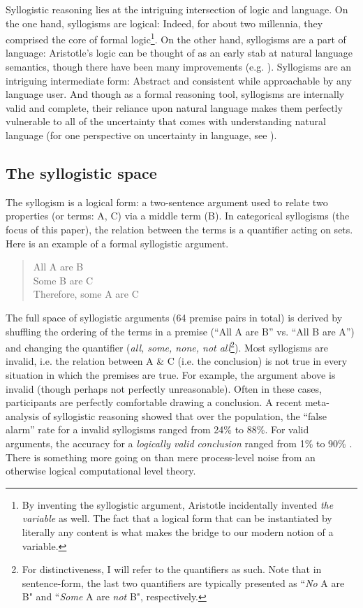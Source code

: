 \documentclass{llncs} %
\begin{document}
Syllogistic reasoning lies at the intriguing intersection of logic and language. On the one hand, syllogisms are logical: Indeed, for about two millennia, they comprised the core of formal logic\footnote{By inventing the syllogistic argument, Aristotle incidentally invented \emph{the variable} as well. The fact that a logical form that can be instantiated by literally any content is what makes the bridge to our modern notion of a variable.}. On the other hand, syllogisms are a part of language: Aristotle's logic can be thought of as an early stab at natural language semantics, though there have been many improvements (e.g. ). Syllogisms are an intriguing intermediate form: Abstract and consistent while approachable by any language user. And though as a formal reasoning tool, syllogisms are internally valid and complete, their reliance upon natural language makes them perfectly vulnerable to all of the uncertainty that comes with understanding natural language (for one perspective on uncertainty in language, see ).

\subsection{The syllogistic space}

The syllogism is a logical form: a two-sentence argument used to relate two properties (or terms: A, C) via a middle term (B). In categorical syllogisms (the focus of this paper), the relation between the terms is a quantifier acting on sets. Here is an example of a formal syllogistic argument.
\begin{quote}
All A are B\\
Some B are C\\
Therefore, some A are C
\end{quote}
The full space of syllogistic arguments (64 premise pairs in total) is derived by shuffling the ordering of the terms in a premise (``All A are B'' vs. ``All B are A'') and changing the quantifier (\emph{all, some, none, not all}\footnote{For distinctiveness, I will refer to the quantifiers as such. Note that in sentence-form, the last two quantifiers are typically presented as ``\emph{No} A are B" and ``\emph{Some} A are \emph{not} B", respectively.}). Most syllogisms are invalid, i.e. the relation between A \& C (i.e. the conclusion) is not true in every situation in which the premises are true. For example, the argument above is invalid (though perhaps not perfectly unreasonable). Often in these cases, participants are perfectly comfortable drawing a conclusion. A recent meta-analysis of syllogistic reasoning showed that over the population, the ``false alarm'' rate for a invalid syllogisms ranged from 24\% to 88\%. For valid arguments, the accuracy for a \emph{logically valid conclusion} ranged from 1\% to 90\% \cite{Khemlani2012}. There is something more going on than mere process-level noise from an otherwise logical computational level theory.
\end{document}
